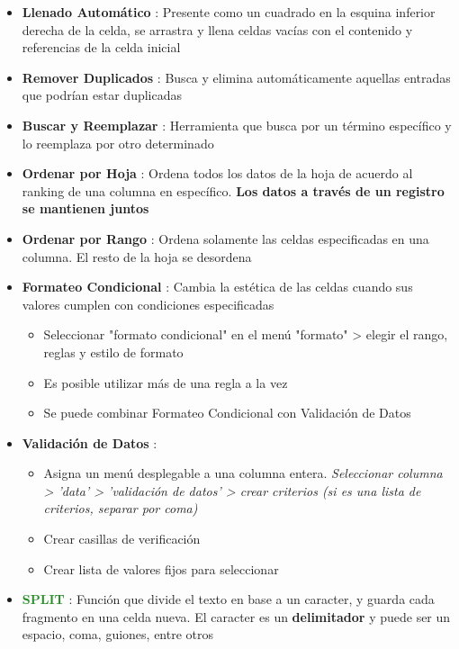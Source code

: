 \begin{itemize}
    \item {\textbf{Llenado Automático} : Presente como un cuadrado en la esquina inferior derecha de la celda, se arrastra y llena celdas vacías con el contenido y referencias de la celda inicial}
    \item {\textbf{Remover Duplicados} : Busca y elimina automáticamente aquellas entradas que podrían estar duplicadas} 
    \item {\textbf{Buscar y Reemplazar} : Herramienta que busca por un término específico y lo reemplaza por otro determinado}
    \item {\textbf{Ordenar por Hoja} : Ordena todos los datos de la hoja de acuerdo al ranking de una columna en específico. \textbf{Los datos a través de un registro se mantienen juntos}}
    \item {\textbf{Ordenar por Rango} : Ordena solamente las celdas especificadas en una columna. El resto de la hoja se desordena}
    \item {\textbf{Formateo Condicional} : Cambia la estética de las celdas cuando sus valores cumplen con condiciones especificadas
        \begin{itemize}
            \item {Seleccionar "formato condicional" en el menú "formato" > elegir el rango, reglas y estilo de formato}
            \item {Es posible utilizar más de una regla a la vez}
            \item {Se puede combinar Formateo Condicional con Validación de Datos}
        \end{itemize}}
    \item {\textbf{Validación de Datos} : 
    \begin{itemize}
        \item {Asigna un menú desplegable a una columna entera. \textit{Seleccionar columna > 'data' > 'validación de datos' > crear criterios (si es una lista de criterios, separar por coma)}}
        \item {Crear casillas de verificación}
        \item {Crear lista de valores fijos para seleccionar}   
    \end{itemize}} 
    \item {\textcolor{ForestGreen}{\textbf{SPLIT}} : Función que divide el texto en base a un caracter, y guarda cada fragmento en una celda nueva. El caracter es un \textbf{delimitador} y puede ser un espacio, coma, guiones, entre otros}

\end{itemize}
